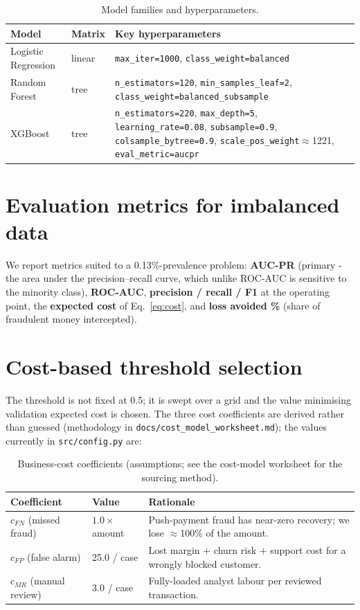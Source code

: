 \documentclass[11pt,a4paper]{report}
\newcommand{\code}[1]{\texttt{\small #1}}
\begin{document}
\begin{table}[h]
\centering
\small
\begin{tabularx}{\textwidth}{@{}l l Y@{}}
\toprule
\textbf{Model} & \textbf{Matrix} & \textbf{Key hyperparameters}\\
\midrule
Logistic Regression & linear & \code{max\_iter=1000}, \code{class\_weight=balanced}\\
Random Forest & tree & \code{n\_estimators=120}, \code{min\_samples\_leaf=2}, \code{class\_weight=balanced\_subsample}\\
XGBoost & tree & \code{n\_estimators=220}, \code{max\_depth=5}, \code{learning\_rate=0.08}, \code{subsample=0.9}, \code{colsample\_bytree=0.9}, \code{scale\_pos\_weight}$\approx$1221, \code{eval\_metric=aucpr}\\
\bottomrule
\end{tabularx}
\caption{Model families and hyperparameters.}
\label{tab:hparams}
\end{table}

\section{Evaluation metrics for imbalanced data}

We report metrics suited to a 0.13\%-prevalence problem: \textbf{AUC-PR} (primary - the
area under the precision–recall curve, which unlike ROC-AUC is sensitive to the minority
class), \textbf{ROC-AUC}, \textbf{precision / recall / F1} at the operating point, the
\textbf{expected cost} of Eq.~\eqref{eq:cost}, and \textbf{loss avoided \%} (share of
fraudulent money intercepted).

\section{Cost-based threshold selection}
\label{sec:cost}

The threshold is not fixed at 0.5; it is swept over a grid and the value minimising
validation expected cost is chosen. The three cost coefficients are derived rather than
guessed (methodology in \code{docs/cost\_model\_worksheet.md}); the values currently in
\code{src/config.py} are:

\begin{table}[h]
\centering
\small
\begin{tabularx}{\textwidth}{@{}l l Y@{}}
\toprule
\textbf{Coefficient} & \textbf{Value} & \textbf{Rationale}\\
\midrule
$c_{FN}$ (missed fraud) & $1.0 \times$ amount & Push-payment fraud has near-zero recovery; we lose $\approx$100\% of the amount.\\
$c_{FP}$ (false alarm) & 25.0 / case & Lost margin $+$ churn risk $+$ support cost for a wrongly blocked customer.\\
$c_{MR}$ (manual review) & 3.0 / case & Fully-loaded analyst labour per reviewed transaction.\\
\bottomrule
\end{tabularx}
\caption{Business-cost coefficients (assumptions; see the cost-model worksheet for the
sourcing method).}
\label{tab:costcoef}
\end{table}
\end{document}
